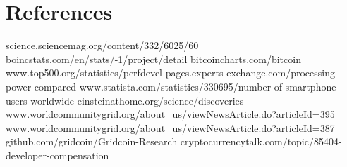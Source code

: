 \section{References}

\label{sec:references}

science.sciencemag.org/content/332/6025/60 
boincstats.com/en/stats/-1/project/detail 
bitcoincharts.com/bitcoin 
www.top500.org/statistics/perfdevel 
pages.experts-exchange.com/processing-power-compared 
www.statista.com/statistics/330695/number-of-smartphone-users-worldwide 
einsteinathome.org/science/discoveries 
www.worldcommunitygrid.org/about_us/viewNewsArticle.do?articleId=395 
www.worldcommunitygrid.org/about_us/viewNewsArticle.do?articleId=387 
github.com/gridcoin/Gridcoin-Research 
cryptocurrencytalk.com/topic/85404-developer-compensation